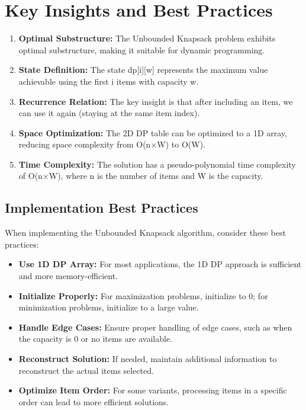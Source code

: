 \documentclass{article}
\begin{document}
\section{Key Insights and Best Practices}

\begin{tcolorbox}[notebox, title=Key Insights]
\begin{enumerate}
    \item \textbf{Optimal Substructure:} The Unbounded Knapsack problem exhibits optimal substructure, making it suitable for dynamic programming.
    
    \item \textbf{State Definition:} The state dp[i][w] represents the maximum value achievable using the first i items with capacity w.
    
    \item \textbf{Recurrence Relation:} The key insight is that after including an item, we can use it again (staying at the same item index).
    
    \item \textbf{Space Optimization:} The 2D DP table can be optimized to a 1D array, reducing space complexity from O(n×W) to O(W).
    
    \item \textbf{Time Complexity:} The solution has a pseudo-polynomial time complexity of O(n×W), where n is the number of items and W is the capacity.
\end{enumerate}
\end{tcolorbox}

\subsection{Implementation Best Practices}

When implementing the Unbounded Knapsack algorithm, consider these best practices:

\begin{itemize}[leftmargin=*]
    \item \textbf{Use 1D DP Array:} For most applications, the 1D DP approach is sufficient and more memory-efficient.
    
    \item \textbf{Initialize Properly:} For maximization problems, initialize to 0; for minimization problems, initialize to a large value.
    
    \item \textbf{Handle Edge Cases:} Ensure proper handling of edge cases, such as when the capacity is 0 or no items are available.
    
    \item \textbf{Reconstruct Solution:} If needed, maintain additional information to reconstruct the actual items selected.
    
    \item \textbf{Optimize Item Order:} For some variants, processing items in a specific order can lead to more efficient solutions.
\end{itemize}
\end{document}
